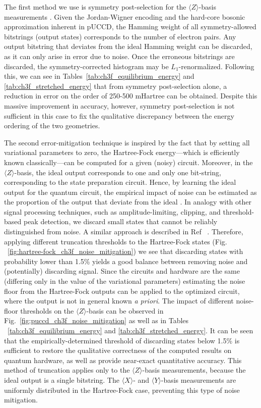 \documentclass[journal,onecolumn]{IEEEtran}
\begin{document}
The first method we use is symmetry post-selection for the $\langle Z \rangle$-basis measurements \cite{Bonet-Monroig2018-xa}. 
Given the Jordan-Wigner encoding and the hard-core bosonic approximation inherent in pUCCD, the Hamming weight of all symmetry-allowed bitstrings (output states) corresponds to the number of electron pairs. 
Any output bitstring that deviates from the ideal Hamming weight can be discarded, as it can only arise in error due to noise. Once the erroneous bitstrings are discarded, the symmetry-corrected histogram may be $L_1$-renormalized. Following this, we can see in Tables~\ref{tab:ch3f_equilibrium_energy} and \ref{tab:ch3f_stretched_energy} that from symmetry post-selection alone, a reduction in error on the order of 250-500 mHartree can be obtained. 
Despite this massive improvement in accuracy, however, symmetry post-selection is not sufficient in this case to fix the qualitative discrepancy between the energy ordering of the two  geometries.

The second error-mitigation technique is inspired by the fact that by setting all variational parameters to zero, the Hartree-Fock energy---which is efficiently known classically---can be computed for a given (noisy) circuit. 
Moreover, in the $\langle Z \rangle$-basis, the ideal output corresponds to one and only one bit-string, corresponding to the state preparation circuit. 
Hence, by learning the ideal output for the quantum circuit, the empirical impact of noise can be estimated as the proportion of the output that deviate from the ideal \cite{Urbanek2021-aw}. 
In analogy with other signal processing techniques, such as amplitude-limiting, clipping, and threshold-based peak detection, we discard small states that cannot be reliably distinguished from noise. 
A similar approach is described in Ref ~\cite{Montanaro2021-yv}. Therefore, applying different truncation thresholds to the Hartree-Fock states (Fig. ~\ref{fig:hartree-fock_ch3f_noise_mitigation}) we see that discarding states with probability lower than 1.5\% yields a good balance between removing noise and (potentially) discarding signal. Since the circuits and hardware are the same (differing only in the value of the variational parameters) estimating the noise floor from the Hartree-Fock outputs can be applied to the optimized circuit, where the output is not in general known \emph{a priori}. 
The impact of different noise-floor thresholds on the $\langle Z \rangle$-basis can be observed in Fig.~\ref{fig:puccd_ch3f_noise_mitigation} as well as in Tables ~\ref{tab:ch3f_equilibrium_energy} and \ref{tab:ch3f_stretched_energy}. It can be seen that the empirically-determined threshold of discarding states below 1.5\% is sufficient to restore the qualitative correctness of the computed results on quantum hardware, as well as provide near-exact quantitative accuracy. 
This method of truncation applies only to the $\langle Z \rangle$-basis measurements, because the ideal output is a single bitstring. 
The $\langle X \rangle$- and $\langle Y \rangle$-basis measurements are uniformly distributed in the Hartree-Fock case, preventing this type of noise mitigation.
\end{document}
